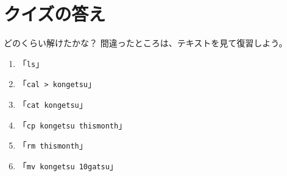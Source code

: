\documentclass[11pt]{jarticle}
\begin{document}
\section*{クイズの答え}

どのくらい解けたかな？ 間違ったところは、テキストを見て復習しよう。

\begin{enumerate}
\item 「\texttt{ls}」
\item 「\texttt{cal > kongetsu}」
\item 「\texttt{cat kongetsu}」
\item 「\texttt{cp kongetsu thismonth}」
\item 「\texttt{rm thismonth}」
\item 「\texttt{mv kongetsu 10gatsu}」
\end{enumerate}
\end{document}
